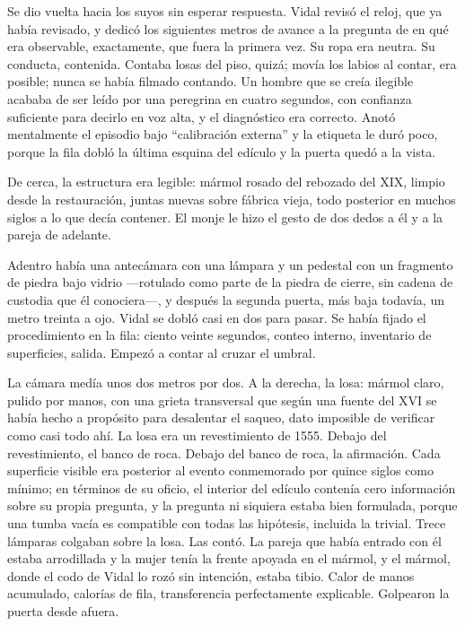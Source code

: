 Se dio vuelta hacia los suyos sin esperar respuesta. Vidal revisó el reloj, que ya había revisado, y dedicó los siguientes metros de avance a la pregunta de en qué era observable, exactamente, que fuera la primera vez. Su ropa era neutra. Su conducta, contenida. Contaba losas del piso, quizá; movía los labios al contar, era posible; nunca se había filmado contando. Un hombre que se creía ilegible acababa de ser leído por una peregrina en cuatro segundos, con confianza suficiente para decirlo en voz alta, y el diagnóstico era correcto. Anotó mentalmente el episodio bajo ``calibración externa'' y la etiqueta le duró poco, porque la fila dobló la última esquina del edículo y la puerta quedó a la vista.

De cerca, la estructura era legible: mármol rosado del rebozado del XIX, limpio desde la restauración, juntas nuevas sobre fábrica vieja, todo posterior en muchos siglos a lo que decía contener. El monje le hizo el gesto de dos dedos a él y a la pareja de adelante.

Adentro había una antecámara con una lámpara y un pedestal con un fragmento de piedra bajo vidrio ---rotulado como parte de la piedra de cierre, sin cadena de custodia que él conociera---, y después la segunda puerta, más baja todavía, un metro treinta a ojo. Vidal se dobló casi en dos para pasar. Se había fijado el procedimiento en la fila: ciento veinte segundos, conteo interno, inventario de superficies, salida. Empezó a contar al cruzar el umbral.

La cámara medía unos dos metros por dos. A la derecha, la losa: mármol claro, pulido por manos, con una grieta transversal que según una fuente del XVI se había hecho a propósito para desalentar el saqueo, dato imposible de verificar como casi todo ahí. La losa era un revestimiento de 1555. Debajo del revestimiento, el banco de roca. Debajo del banco de roca, la afirmación. Cada superficie visible era posterior al evento conmemorado por quince siglos como mínimo; en términos de su oficio, el interior del edículo contenía cero información sobre su propia pregunta, y la pregunta ni siquiera estaba bien formulada, porque una tumba vacía es compatible con todas las hipótesis, incluida la trivial. Trece lámparas colgaban sobre la losa. Las contó. La pareja que había entrado con él estaba arrodillada y la mujer tenía la frente apoyada en el mármol, y el mármol, donde el codo de Vidal lo rozó sin intención, estaba tibio. Calor de manos acumulado, calorías de fila, transferencia perfectamente explicable. Golpearon la puerta desde afuera.

